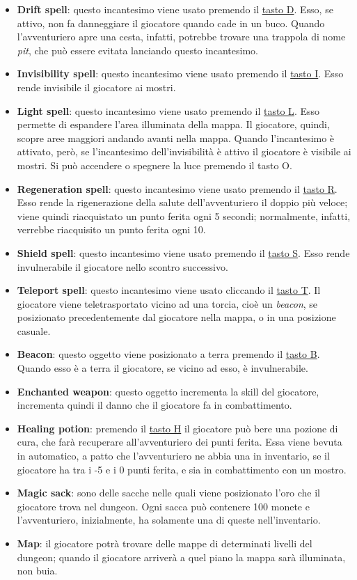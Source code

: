 \documentclass{report}
\begin{document}
\begin{itemize}
    \item \textbf{Drift spell}: questo incantesimo viene usato premendo il \underline{tasto D}. Esso, se attivo, non fa danneggiare il giocatore quando cade in un buco. Quando l'avventuriero apre una cesta, infatti, potrebbe trovare una trappola di nome \textit{pit}, che può essere evitata lanciando questo incantesimo.
    \item \textbf{Invisibility spell}: questo incantesimo viene usato premendo il \underline{tasto I}. Esso rende invisibile il giocatore ai mostri. 
    \item \textbf{Light spell}: questo incantesimo viene usato premendo il \underline{tasto L}. Esso permette di espandere l’area illuminata della mappa. Il giocatore, quindi, scopre aree maggiori andando avanti nella mappa. Quando l’incantesimo è attivato, però, se l’incantesimo dell'invisibilità è attivo il giocatore è visibile ai mostri. Si può accendere o spegnere la luce premendo il tasto O.
    \item \textbf{Regeneration spell}: questo incantesimo viene usato premendo il \underline{tasto R}. Esso rende la rigenerazione della salute dell’avventuriero il doppio più veloce; viene quindi riacquistato un punto ferita ogni 5 secondi; normalmente, infatti, verrebbe riacquisito un punto ferita ogni 10.
    \item \textbf{Shield spell}: questo incantesimo viene usato premendo il \underline{tasto S}. Esso rende invulnerabile il giocatore nello scontro successivo.
    \item \textbf{Teleport spell}: questo incantesimo viene usato cliccando il \underline{tasto T}. Il giocatore viene teletrasportato vicino ad una torcia, cioè un \textit{beacon}, se posizionato precedentemente dal giocatore nella mappa, o in una posizione casuale.
    \item \textbf{Beacon}: questo oggetto viene posizionato a terra premendo il \underline{tasto B}. Quando esso è a terra il giocatore, se vicino ad esso, è invulnerabile.
    \item \textbf{Enchanted weapon}: questo oggetto incrementa la skill del giocatore, incrementa quindi il danno che il giocatore fa in combattimento.
    \item \textbf{Healing potion}: premendo il \underline{tasto H} il giocatore può bere una pozione di cura, che farà recuperare all’avventuriero dei punti ferita. Essa viene bevuta in automatico, a patto che l'avventuriero ne abbia una in inventario, se il giocatore ha tra i -5 e i 0 punti ferita, e sia in combattimento con un mostro.
    \item \textbf{Magic sack}: sono delle sacche nelle quali viene posizionato l’oro che il giocatore trova nel dungeon. Ogni sacca può contenere 100 monete e l’avventuriero, inizialmente, ha solamente una di queste nell’inventario.
    \item \textbf{Map}: il giocatore potrà trovare delle mappe di determinati livelli del dungeon; quando il giocatore arriverà a quel piano la mappa sarà illuminata, non buia.
\end{itemize}
\end{document}
